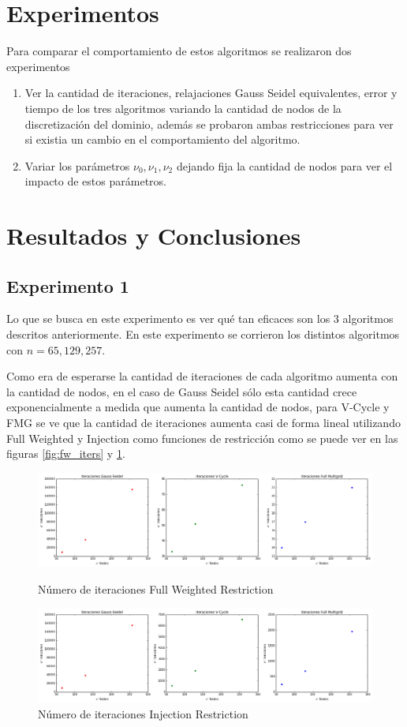 \documentclass[letter, 10pt]{article}
\begin{document}
\section{Experimentos}
Para comparar el comportamiento de estos algoritmos se realizaron dos experimentos
\begin{enumerate}
    \item Ver la cantidad de iteraciones, relajaciones Gauss Seidel equivalentes, error y tiempo de los tres algoritmos variando la cantidad de nodos de la discretización del dominio, además se probaron ambas restricciones para ver si existia un cambio en el comportamiento del algoritmo.
    \item Variar los parámetros $\nu_0,\nu_1,\nu_2$ dejando fija la cantidad de nodos para ver el impacto de estos parámetros.
\end{enumerate}

\section{Resultados y Conclusiones }

\subsection{Experimento 1}
Lo que se busca en este experimento es ver qué tan eficaces son los 3 algoritmos descritos anteriormente. En este experimento se corrieron los distintos algoritmos con $n= 65,129,257$.

Como era de esperarse la cantidad de iteraciones de cada algoritmo aumenta con la cantidad de nodos, en el caso de Gauss Seidel sólo esta cantidad crece exponencialmente a medida que aumenta la cantidad de nodos, para V-Cycle y FMG se ve que la cantidad de iteraciones aumenta casi de forma lineal utilizando Full Weighted y Injection como funciones de restricción como se puede ver en las figuras \ref{fig:fw_iters} y \ref{fig:iters}. 


\begin{figure}[H]
    \centering
    \includegraphics[scale=0.4]{fw_iters.png}
    \caption{Número de iteraciones Full Weighted Restriction}
    \label{fig:fw_iters}
    \includegraphics[scale=0.4]{injection_iters.png}
    \caption{Número de iteraciones Injection Restriction}
    \label{fig:iters}
\end{figure}
\end{document}
